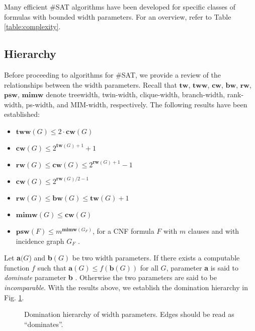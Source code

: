 \documentclass{article}
\begin{document}
Many efficient \#SAT algorithms have been developed for specific classes of formulas with bounded width parameters.
For an overview, refer to Table \ref{table:complexity}.

\subsection{Hierarchy}

Before proceeding to algorithms for \#SAT, we provide a review of the relationships between the width parameters.
Recall that $\mathbf{tw}$, $\mathbf{tww}$, $\mathbf{cw}$, $\mathbf{bw}$, $\mathbf{rw}$, $\mathbf{psw}$, $\mathbf{mimw}$ denote treewidth, twin-width, clique-width, branch-width, rank-width, ps-width, and MIM-width, respectively.
The following results have been established:
\begin{itemize}[--]
	\item $\mathbf{tww}(G) \leq 2\cdot \mathbf{cw}(G)$ \cite{DBLP:conf/sat/GanianPSSS22}
	\item $\mathbf{cw}(G) \leq 2^{\mathbf{tw}(G)+1}+1$ \cite{DBLP:journals/dam/FischerMR08}
	\item $\mathbf{rw}(G) \leq \mathbf{cw}(G) \leq 2^{\mathbf{rw}(G)+1}-1$ \cite{DBLP:journals/fuin/GanianHO13}
	\item $\mathbf{cw}(G) \leq 2^{\mathbf{rw}(G)/2-1}$ \cite{DBLP:journals/fuin/GanianHO13}
	\item $\mathbf{rw}(G) \leq \mathbf{bw}(G) \leq \mathbf{tw}(G)+1$ \cite{DBLP:journals/fuin/GanianHO13, DBLP:journals/jgt/Oum08}
	\item $\mathbf{mimw}(G) \leq \mathbf{cw}(G)$ \cite{DBLP:conf/sat/SaetherTV14}
	\item $\mathbf{psw}(F) \leq m^{\textbf{mimw}(G_F)}$, for a CNF formula $F$ with $m$ clauses and with incidence graph $G_F$ \cite{DBLP:conf/sat/SaetherTV14}.
\end{itemize}

\noindent
Let \textbf{a}$(G$) and \textbf{b}$(G)$ be two width parameters.
If there exists a computable function $f$ such that $\mathbf{a}(G) \leq f(\mathbf{b}(G))$ for all $G$, parameter \textbf{a} is said to {\em dominate} parameter \textbf{b} \cite{DBLP:conf/sat/GanianS17}.
Otherwise the two parameters are said to be {\em incomparable}.
With the results above, we establish the domination hierarchy in Fig. \ref{fig:hierarchy}.

\begin{figure}
	\centering
	
	\caption{Domination hierarchy of width parameters. Edges should be read as ``dominates''.}
	\label{fig:hierarchy}
\end{figure}
\end{document}
